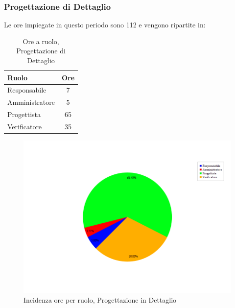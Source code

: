 \subsubsection{Progettazione di Dettaglio}
Le ore impiegate in questo periodo sono 112 e vengono ripartite in:
\begin{table}[H]
	\begin{center}
		\begin{tabular}{|l|c|}
			\hline
			\textbf{Ruolo}	& \textbf{Ore} \\
			\hline
			Responsabile	&	7	\\
			\hline
			Amministratore	&	5	\\
			\hline
			Progettista		&	65	\\
			\hline
			Verificatore	&	35	\\
			\hline
		\end{tabular}
	\end{center}
	\caption{Ore a ruolo, Progettazione di Dettaglio}
\end{table}

\begin{figure}[H]
	\centering
	\includegraphics[scale=0.3]{immagini/Grafi/OreRuoloPD}
	\caption{Incidenza ore per ruolo, Progettazione in Dettaglio}
\end{figure}


